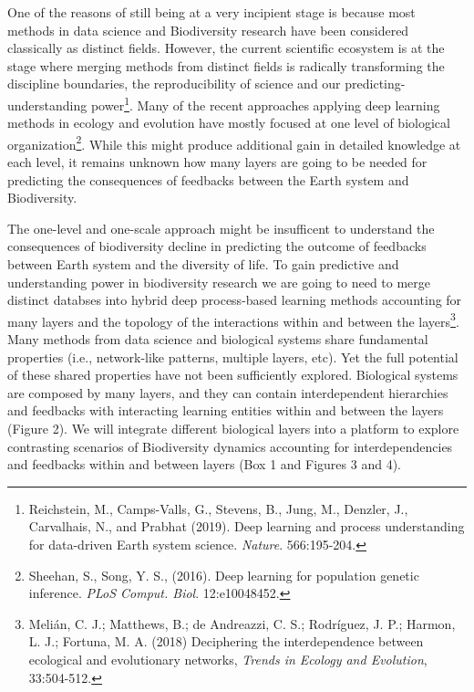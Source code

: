 \documentclass[authoryear,1p,12pt]{elsarticle}
\begin{document}
One of the reasons of still being at a very incipient stage is because
most methods in data science and Biodiversity research have been
considered classically as distinct fields. However, the current
scientific ecosystem is at the stage where merging methods from
distinct fields is radically transforming the discipline boundaries,
the reproducibility of science and our predicting-understanding
power\footnote{Reichstein, M., Camps-Valls, G., Stevens, B., Jung, M.,
  Denzler, J., Carvalhais, N., and Prabhat (2019). Deep learning and
  process understanding for data-driven Earth system science. {\em
    Nature}. 566:195-204.}. Many of the recent approaches applying
deep learning methods in ecology and evolution have mostly focused at
one level of biological organization\footnote{Sheehan, S., Song,
  Y. S., (2016). Deep learning for population genetic inference.  {\em
    PLoS Comput. Biol}. 12:e10048452.}. While this might produce
additional gain in detailed knowledge at each level, it remains
unknown how many layers are going to be needed for predicting the
consequences of feedbacks between the Earth system and Biodiversity.

The one-level and one-scale approach might be insufficent to
understand the consequences of biodiversity decline in predicting the
outcome of feedbacks between Earth system and the diversity of
life. To gain predictive and understanding power in biodiversity
research we are going to need to merge distinct databses into hybrid
deep process-based learning methods accounting for many layers and the
topology of the interactions within and between the
layers\footnote{Melián, C. J.; Matthews, B.; de Andreazzi, C. S.;
  Rodríguez, J. P.; Harmon, L. J.; Fortuna, M. A. (2018) Deciphering
  the interdependence between ecological and evolutionary networks,
  {\em Trends in Ecology and Evolution}, 33:504-512.}. Many methods
from data science and biological systems share fundamental properties
(i.e., network-like patterns, multiple layers, etc). Yet the full
potential of these shared properties have not been sufficiently
explored. Biological systems are composed by many layers, and they can
contain interdependent hierarchies and feedbacks with interacting
learning entities within and between the layers (Figure 2). We will
integrate different biological layers into a platform to explore
contrasting scenarios of Biodiversity dynamics accounting for
interdependencies and feedbacks within and between layers (Box 1 and
Figures 3 and 4).
\end{document}
